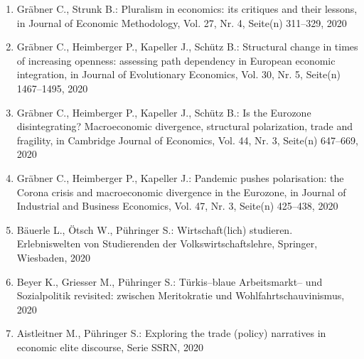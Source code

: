 \begin{enumerate}
	 \item Gräbner C., Strunk B.: Pluralism in economics: its critiques and their lessons, in Journal of Economic Methodology, Vol. 27, Nr. 4, Seite(n) 311--329, 2020
	 \item Gräbner C., Heimberger P., Kapeller J., Schütz B.: Structural change in times of increasing openness: assessing path dependency in European economic integration, in Journal of Evolutionary Economics, Vol. 30, Nr. 5, Seite(n) 1467--1495, 2020
	 \item Gräbner C., Heimberger P., Kapeller J., Schütz B.: Is the Eurozone disintegrating? Macroeconomic divergence, structural polarization, trade and fragility, in Cambridge Journal of Economics, Vol. 44, Nr. 3, Seite(n) 647--669, 2020
	 \item Gräbner C., Heimberger P., Kapeller J.: Pandemic pushes polarisation: the Corona crisis and macroeconomic divergence in the Eurozone, in Journal of Industrial and Business Economics, Vol. 47, Nr. 3, Seite(n) 425--438, 2020
	 \item Bäuerle L., Ötsch W., Pühringer S.: Wirtschaft(lich) studieren. Erlebniswelten von Studierenden der Volkswirtschaftslehre, Springer, Wiesbaden, 2020
	 \item Beyer K., Griesser M., Pühringer S.: Türkis--blaue Arbeitsmarkt-- und Sozialpolitik revisited: zwischen Meritokratie und Wohlfahrtschauvinismus, 2020
	 \item Aistleitner M., Pühringer S.: Exploring the trade (policy) narratives in economic elite discourse, Serie SSRN, 2020
\end{enumerate}
